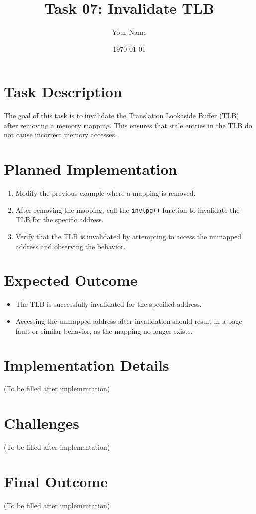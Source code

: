 \documentclass[a4paper,12pt]{report}
\begin{document}
\title{Task 07: Invalidate TLB}
\author{Your Name}
\date{\today}
\maketitle

\tableofcontents

\chapter{Task Description}
The goal of this task is to invalidate the Translation Lookaside Buffer (TLB) after removing a memory mapping. This ensures that stale entries in the TLB do not cause incorrect memory accesses.

\chapter{Planned Implementation}
\begin{enumerate}
    \item Modify the previous example where a mapping is removed.
    \item After removing the mapping, call the \texttt{invlpg()} function to invalidate the TLB for the specific address.
    \item Verify that the TLB is invalidated by attempting to access the unmapped address and observing the behavior.
\end{enumerate}

\chapter{Expected Outcome}
\begin{itemize}
    \item The TLB is successfully invalidated for the specified address.
    \item Accessing the unmapped address after invalidation should result in a page fault or similar behavior, as the mapping no longer exists.
\end{itemize}

\chapter{Implementation Details}
(To be filled after implementation)

\chapter{Challenges}
(To be filled after implementation)

\chapter{Final Outcome}
(To be filled after implementation)
\end{document}
